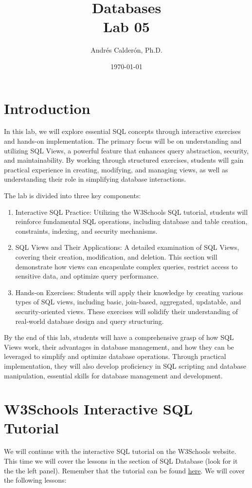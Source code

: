 \documentclass{article}
\title{Databases\\Lab 05}
\author{Andrés Calderón, Ph.D.}
\date{\today}
\begin{document}
\maketitle

\section{Introduction}
In this lab, we will explore essential SQL concepts through interactive exercises and hands-on implementation. The primary focus will be on understanding and utilizing SQL Views, a powerful feature that enhances query abstraction, security, and maintainability. By working through structured exercises, students will gain practical experience in creating, modifying, and managing views, as well as understanding their role in simplifying database interactions.

The lab is divided into three key components:

\begin{enumerate}
  \item Interactive SQL Practice: Utilizing the W3Schools SQL tutorial, students will reinforce fundamental SQL operations, including database and table creation, constraints, indexing, and security mechanisms.
  \item SQL Views and Their Applications: A detailed examination of SQL Views, covering their creation, modification, and deletion. This section will demonstrate how views can encapsulate complex queries, restrict access to sensitive data, and optimize query performance.
  \item Hands-on Exercises: Students will apply their knowledge by creating various types of SQL views, including basic, join-based, aggregated, updatable, and security-oriented views. These exercises will solidify their understanding of real-world database design and query structuring.

\end{enumerate}

By the end of this lab, students will have a comprehensive grasp of how SQL Views work, their advantages in database management, and how they can be leveraged to simplify and optimize database operations. Through practical implementation, they will also develop proficiency in SQL scripting and database manipulation, essential skills for database management and development.

\section{W3Schools Interactive SQL Tutorial}
We will continue with the interactive SQL tutorial on the W3Schools website.  This time we will cover the lessons in the section of SQL Database (look for it the the left panel). Remember that the tutorial can be found \href{https://www.w3schools.com/sql/}{here}. We will cover the following lessons:
\end{document}
